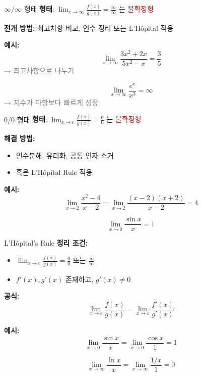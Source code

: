 \documentclass[aspectratio=169]{beamer}
\begin{document}
\begin{frame}{$ \infty / \infty $ 형태}
  \textbf{형태}: \( \lim_{x \to \infty} \frac{f(x)}{g(x)} = \frac{\infty}{\infty} \) 는 \textcolor{red}{불확정형}

  \vspace{0.5em}
  \textbf{전개 방법:} 최고차항 비교, 인수 정리 또는 L'Hôpital 적용

  \vspace{1em}
  \textbf{예시:}
  \[
    \lim_{x \to \infty} \frac{3x^2 + 2x}{5x^2 - x} = \frac{3}{5}
  \]
  \textcolor{gray}{→ 최고차항으로 나누기}

  \[
    \lim_{x \to \infty} \frac{e^x}{x^3} = \infty
  \]
  \textcolor{gray}{→ 지수가 다항보다 빠르게 성장}
\end{frame}



\begin{frame}{$ 0 / 0 $ 형태}
  \textbf{형태}: \( \lim_{x \to c} \frac{f(x)}{g(x)} = \frac{0}{0} \) 는 \textcolor{red}{불확정형}

  \vspace{0.5em}
  \textbf{해결 방법:}
  \begin{itemize}
    \item 인수분해, 유리화, 공통 인자 소거
    \item 혹은 L'Hôpital Rule 적용
  \end{itemize}

  \vspace{1em}
  \textbf{예시:}
  \[
    \lim_{x \to 2} \frac{x^2 - 4}{x - 2} = \lim_{x \to 2} \frac{(x-2)(x+2)}{x-2} = 4
  \]

  \[
    \lim_{x \to 0} \frac{\sin x}{x} = 1
  \]
\end{frame}


\begin{frame}{L'Hôpital's Rule}
  \textbf{정리 조건:}
  \begin{itemize}
    \item \( \lim_{x \to c} \frac{f(x)}{g(x)} = \frac{0}{0} \) 또는 \( \frac{\infty}{\infty} \)
    \item \( f'(x), g'(x) \) 존재하고, \( g'(x) \neq 0 \)
  \end{itemize}

  \vspace{0.5em}
  \textbf{공식:}
  \[
    \lim_{x \to c} \frac{f(x)}{g(x)} = \lim_{x \to c} \frac{f'(x)}{g'(x)}
  \]

  \vspace{1em}
  \textbf{예시:}
  \[
    \lim_{x \to 0} \frac{\sin x}{x} = \lim_{x \to 0} \frac{\cos x}{1} = 1
  \]

  \[
    \lim_{x \to \infty} \frac{\ln x}{x} = \lim_{x \to \infty} \frac{1/x}{1} = 0
  \]
\end{frame}
\end{document}

